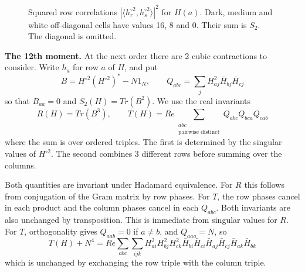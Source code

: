 \documentclass[11pt,a4paper]{article}
\theoremstyle{remark}
\begin{document}
\begin{figure}[htb!]
\centering
{}
\caption{Squared row correlations $|\langle h_r^{\circ2},h_s^{\circ2}\rangle|^2$
for $H(a)$. Dark, medium and white off-diagonal cells have values 16, 8 and 0.
Their sum is $S_2$. The diagonal is omitted.}\label{fig:grams}
\end{figure}



\medskip
\noindent\textbf{The 12th moment.}
At the next order there are 2 cubic contractions to consider. Write $h_a$ for row $a$ of $H$, and put
\[
 B=H^{\circ2}(H^{\circ2})^*-N1_N,\qquad
 Q_{abc}=\sum_jH_{aj}^2\bar H_{bj}\bar H_{cj}
\]
so that $B_{aa}=0$ and $S_2(H)=Tr(B^2)$. We use the real invariants
\[
 R(H)=Tr(B^3),\qquad
 T(H)=Re\sum_{\substack{abc\\\text{pairwise distinct}}}
                         Q_{abc}Q_{bca}Q_{cab}
\]
where the sum is over ordered triples. The first is determined by the singular values of $H^{\circ2}$. The second combines 3 different rows before summing over the columns.

Both quantities are invariant under Hadamard equivalence. For $R$ this follows from conjugation of the Gram matrix by row phases. For $T$, the row phases cancel in each product and the column phases cancel in each $Q_{abc}$. Both invariants are also unchanged by transposition. This is immediate from singular values for $R$. For $T$, orthogonality gives $Q_{aab}=0$ if $a\ne b$, and $Q_{aaa}=N$, so
\[
 T(H)+N^4=Re\sum_{abc}\sum_{ijk}
 H_{ai}^2H_{bj}^2H_{ck}^2
 \bar H_{bi}\bar H_{ci}\bar H_{aj}\bar H_{cj}\bar H_{ak}\bar H_{bk}
\]
which is unchanged by exchanging the row triple with the column triple.
\end{document}
